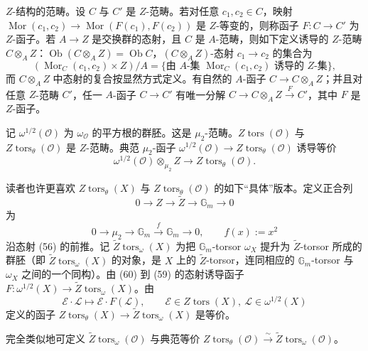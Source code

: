 $Z$-结构的范畴。设 $C$ 与 $C'$ 是 $Z$-范畴。若对任意 $c_{1},c_{2}\in C$，映射 $\operatorname{Mor}(c_{1},c_{2})\to\operatorname{Mor}(F(c_{1}),F(c_{2}))$ 是 $Z$-等变的，则称函子 $F:C\to C'$ 为 $Z$-函子。若 $A\to Z$ 是交换群的态射，且 $C$ 是 $A$-范畴，则如下定义诱导的 $Z$-范畴 $C\otimes_{A}Z$：$\operatorname{Ob}(C\otimes_{A}Z)=\operatorname{Ob}C$，$(C\otimes_{A}Z)$-态射 $c_{1}\to c_{2}$ 的集合为
\[
  (\operatorname{Mor}_{C}(c_{1},c_{2})\times Z)/A
  =\{\text{由 }A\text{-集 }\operatorname{Mor}_{C}(c_{1},c_{2})\text{ 诱导的 }Z\text{-集}\},
\]
而 $C\otimes_{A}Z$ 中态射的复合按显然方式定义。有自然的 $A$-函子 $C\to C\otimes_{A}Z$；并且对任意 $Z$-范畴 $C'$，任一 $A$-函子 $C\to C'$ 有唯一分解 $C\to C\otimes_{A}Z\xrightarrow{F}C'$，其中 $F$ 是 $Z$-函子。

记 $\omega^{1/2}(\mathcal{O})$ 为 $\omega_{\mathcal{O}}$ 的平方根的群胚。这是 $\mu_{2}$-范畴。$Z\operatorname{tors}(\mathcal{O})$ 与 $Z\operatorname{tors}_{\theta}(\mathcal{O})$ 是 $Z$-范畴。典范 $\mu_{2}$-函子 $\omega^{1/2}(\mathcal{O})\to Z\operatorname{tors}_{\theta}(\mathcal{O})$ 诱导等价
\[
  \omega^{1/2}(\mathcal{O})\otimes_{\mu_{2}}Z\to Z\operatorname{tors}_{\theta}(\mathcal{O}).
\]

 读者也许更喜欢 $Z\operatorname{tors}_{\theta}(X)$ 与 $Z\operatorname{tors}_{\theta}(\mathcal{O})$ 的如下“具体”版本。定义正合列
\begin{equation}\tag{59}
  0\to Z\to\widetilde{Z}\to\mathbb{G}_{m}\to 0
\end{equation}
为
\begin{equation}\tag{60}
  0\to\mu_{2}\to\mathbb{G}_{m}\xrightarrow{f}\mathbb{G}_{m}\to 0,\qquad f(x):=x^{2}
\end{equation}
沿态射 (56) 的前推。记 $\widetilde{Z}\operatorname{tors}_{\omega}(X)$ 为把 $\mathbb{G}_{m}$-torsor $\omega_{X}$ 提升为 $\widetilde{Z}$-torsor 所成的群胚（即 $\widetilde{Z}\operatorname{tors}_{\omega}(X)$ 的对象，是 $X$ 上的 $\widetilde{Z}$-torsor，连同相应的 $\mathbb{G}_{m}$-torsor 与 $\omega_{X}$ 之间的一个同构）。由 (60) 到 (59) 的态射诱导函子 $F:\omega^{1/2}(X)\to\widetilde{Z}\operatorname{tors}_{\omega}(X)$。由
\[
  \mathcal{E}\cdot\mathcal{L}\mapsto\mathcal{E}\cdot F(\mathcal{L}),\qquad
  \mathcal{E}\in Z\operatorname{tors}(X),\ \mathcal{L}\in\omega^{1/2}(X)
\]
定义的函子 $Z\operatorname{tors}_{\theta}(X)\to\widetilde{Z}\operatorname{tors}_{\omega}(X)$ 是等价。

完全类似地可定义 $\widetilde{Z}\operatorname{tors}_{\omega}(\mathcal{O})$ 与典范等价 $Z\operatorname{tors}_{\theta}(\mathcal{O})\xrightarrow{\sim}\widetilde{Z}\operatorname{tors}_{\omega}(\mathcal{O})$。

